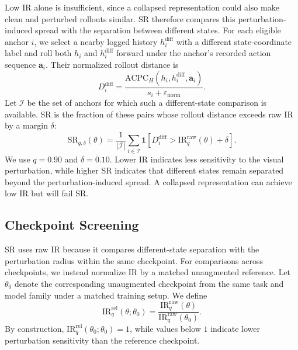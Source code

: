 Low IR alone is insufficient, since a collapsed representation could also make
clean and perturbed rollouts similar. SR therefore compares this
perturbation-induced spread with the separation between different states.
For each eligible anchor $i$, we select a nearby logged history
$h_i^{\mathrm{diff}}$ with a different state-coordinate label and roll both
$h_i$ and $h_i^{\mathrm{diff}}$ forward under the anchor's recorded action
sequence $\mathbf a_i$. Their normalized rollout distance is
\begin{equation}
D_i^{\mathrm{diff}}
=
\frac{
\mathrm{ACPC}_H(h_i, h_i^{\mathrm{diff}},\mathbf a_i)
}{
s_i+\varepsilon_{\mathrm{norm}}
}.
\label{eq:different-state-distance}
\end{equation}
Let $\mathcal I$ be the set of anchors for which such a different-state
comparison is available. SR is the fraction of these pairs whose rollout
distance exceeds raw IR by a margin $\delta$:
\begin{equation}
\mathrm{SR}_{q,\delta}(\theta)
=
\frac{1}{|\mathcal I|}
\sum_{i\in\mathcal I}
\mathbf 1\!\left[
D_i^{\mathrm{diff}}
>
\mathrm{IR}^{\mathrm{raw}}_q(\theta)+\delta
\right].
\label{eq:sr}
\end{equation}
We use $q=0.90$ and $\delta=0.10$. Lower IR indicates less sensitivity to the
visual perturbation, while higher SR indicates that different states remain
separated beyond the perturbation-induced spread. A collapsed representation
can achieve low IR but will fail SR.


\subsection{Checkpoint Screening}
\label{sec:checkpoint-threshold-selection}

SR uses raw IR because it compares different-state separation with the
perturbation radius within the same checkpoint. For comparisons across
checkpoints, we instead normalize IR by a matched unaugmented reference. Let
$\theta_0$ denote the corresponding unaugmented checkpoint from the same task
and model family under a matched training setup. We define
\begin{equation}
\mathrm{IR}^{\mathrm{rel}}_{q}(\theta;\theta_0)
=
\frac{\mathrm{IR}^{\mathrm{raw}}_{q}(\theta)}
{\mathrm{IR}^{\mathrm{raw}}_{q}(\theta_0)}.
\label{eq:ir-relative}
\end{equation}
By construction, $\mathrm{IR}^{\mathrm{rel}}_{q}(\theta_0;\theta_0)=1$, while
values below $1$ indicate lower perturbation sensitivity than the reference
checkpoint.

